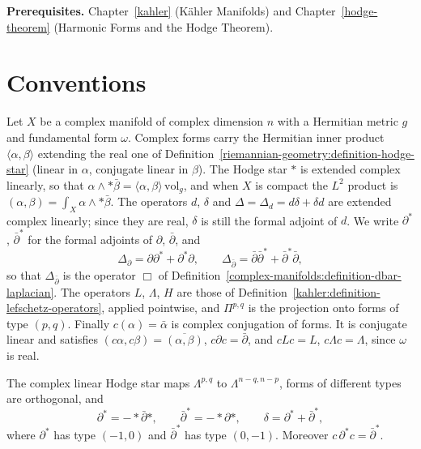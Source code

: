 \noindent\textbf{Prerequisites.} Chapter~\ref{kahler} (K\"ahler Manifolds) and Chapter~\ref{hodge-theorem} (Harmonic Forms and the Hodge
Theorem).

\section{Conventions}\label{kahler:section-conventions}

\begin{notation}\label{kahler:notation-hermitian-forms}
Let $X$ be a complex manifold of complex dimension $n$ with a Hermitian metric $g$ and fundamental form $\omega$. Complex forms carry the
Hermitian inner product $\langle\alpha, \beta\rangle$ extending the real one of Definition~\ref{riemannian-geometry:definition-hodge-star}
(linear in $\alpha$, conjugate linear in $\beta$). The Hodge star $*$ is extended complex linearly, so that
$\alpha \wedge *\bar\beta = \langle\alpha, \beta\rangle\,\mathrm{vol}_g$, and when $X$ is compact the $L^2$ product is
$(\alpha, \beta) = \int_X\alpha \wedge *\bar\beta$. The operators $d$, $\delta$ and $\Delta = \Delta_d = d\delta + \delta d$ are extended
complex linearly; since they are real, $\delta$ is still the formal adjoint of $d$. We write $\partial^*$, $\bar\partial^*$ for the formal
adjoints of $\partial$, $\bar\partial$, and
\[
\Delta_\partial = \partial\partial^* + \partial^*\partial, \qquad \Delta_{\bar\partial} = \bar\partial\bar\partial^* + \bar\partial^*\bar\partial,
\]
so that $\Delta_{\bar\partial}$ is the operator $\Box$ of Definition~\ref{complex-manifolds:definition-dbar-laplacian}. The operators $L$,
$\Lambda$, $H$ are those of Definition~\ref{kahler:definition-lefschetz-operators}, applied pointwise, and $\Pi^{p,q}$ is the projection
onto forms of type $(p,q)$. Finally $c(\alpha) = \bar\alpha$ is complex conjugation of forms. It is conjugate linear and satisfies
$(c\alpha, c\beta) = \overline{(\alpha, \beta)}$, $c\partial c = \bar\partial$, and $cLc = L$, $c\Lambda c = \Lambda$, since
$\omega$ is real.
\end{notation}

\begin{lemma}\label{kahler:lemma-adjoints-by-type}
The complex linear Hodge star maps $\Lambda^{p,q}$ to $\Lambda^{n-q,n-p}$, forms of different types are orthogonal, and
\[
\partial^* = -*\bar\partial*, \qquad \bar\partial^* = -*\partial*, \qquad \delta = \partial^* + \bar\partial^*,
\]
where $\partial^*$ has type $(-1, 0)$ and $\bar\partial^*$ has type $(0, -1)$. Moreover $c\,\partial^*c = \bar\partial^*$.
\end{lemma}

